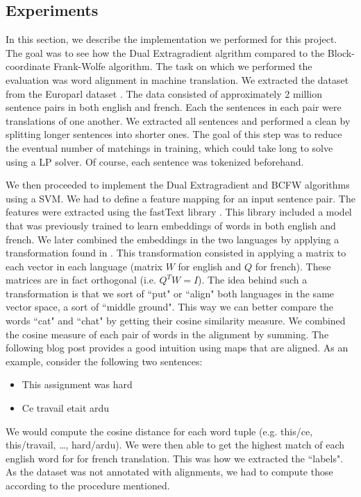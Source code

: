 \subsection{Experiments}

In this section, we describe the implementation we performed for this project.
The goal was to see how the Dual Extragradient algrithm compared to the
Block-coordinate Frank-Wolfe algorithm. The task on which we performed the
evaluation was word alignment in machine translation. We extracted the dataset
from the Europarl dataset \cite{EuroparlParallelCorpus}. The data consisted of
approximately 2 million sentence pairs in both english and french. Each the
sentences in each pair were translations of one another. We extracted all
sentences and performed a clean by splitting longer sentences into shorter ones.
The goal of this step was to reduce the eventual number of matchings in
training, which could take long to solve using a LP solver. Of course, each
sentence was tokenized beforehand.

We then proceeded to implement the Dual Extragradient and BCFW algorithms using
a SVM. We had to define a feature mapping for an input sentence pair. The features
were extracted using the fastText library \cite{fastText}. This library included
a model that was previously trained to learn embeddings of words in both english
and french. We later combined the embeddings in the two languages by applying a
transformation found in \citet{chojnackiRandomGraphGenerator2010}. This transformation consisted in applying
a matrix to each vector in each language (matrix $W$ for english and $Q$ for french). 
These matrices are in fact orthogonal (i.e. $Q^T W = I$). The idea behind such a transformation
is that we sort of ``put" or ``align" both languages in the same vector space, a sort of ``middle ground". 
This way we can better compare the words ``cat" and ``chat" by getting their cosine similarity measure. 
We combined the cosine measure of each pair of words in the alignment by summing. The following blog post
\citet{AligningVectorRepresentations2017} provides a good intuition using maps that are aligned.
As an example, consider the following two sentences:
\begin{itemize}
  \item This assignment was hard
  \item Ce travail etait ardu
\end{itemize}
We would compute the cosine distance for each word tuple (e.g. this/ce, this/travail,
\dots, hard/ardu). We were then able to get the highest match of each english word for
for french translation. This was how we extracted the ``labels". As the dataset was
not annotated with alignments, we had to compute those according to the procedure mentioned.


